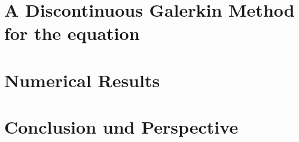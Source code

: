 \documentclass{template}
\begin{document}
\chapter{A Discontinuous Galerkin Method for the \MA equation}
\label{ch:ourMethod}


\chapter{Numerical Results}
\label{ch:NumericalResults}
%

\chapter{Conclusion und Perspective}
\label{ch:conclusion}



\begin{appendices}

%	
\end{appendices}



\newpage
%
\newpage


\end{document}
